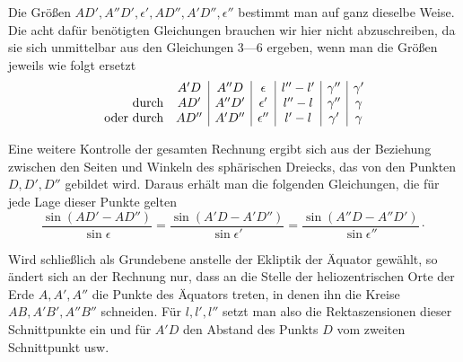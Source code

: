 Die Größen $AD',A''D',\epsilon',AD'',A'D'',\epsilon''$ bestimmt man auf ganz dieselbe Weise. Die acht dafür benötigten Gleichungen
brauchen wir hier nicht abzuschreiben, da sie sich unmittelbar aus den Gleichungen 3---6
ergeben, wenn man die Größen jeweils wie folgt ersetzt
\[
\begin{array}{r c|c|c|c|c|c}
 & A'D & A''D & \epsilon & l''-l' & \gamma'' & \gamma'\\
\text{durch} & AD' & A''D' & \epsilon' & l''-l & \gamma'' & \gamma\\
\text{oder durch} & AD'' & A'D'' & \epsilon'' & l'-l & \gamma' & \gamma
\end{array}
\]

Eine weitere Kontrolle der gesamten Rechnung ergibt sich aus der Beziehung zwischen den Seiten
und Winkeln des sphärischen Dreiecks, das von den Punkten $D,D',D''$ gebildet wird. Daraus erhält
man die folgenden Gleichungen, die für jede Lage dieser Punkte gelten
\[
\frac{\sin(AD'-AD'')}{\sin\epsilon}=\frac{\sin(A'D-A'D'')}{\sin\epsilon'}=\frac{\sin(A''D-A''D')}{\sin\epsilon''}\mathpunct{\cdot}
\]

Wird schließlich als Grundebene anstelle der Ekliptik der Äquator \hypertarget{native-185}{}gewählt, so ändert sich
an der Rechnung nur, dass an die Stelle der heliozentrischen Orte der Erde $A,A',A''$ die Punkte des
Äquators treten, in denen ihn die Kreise $AB,A'B',A''B''$ schneiden. Für $l,l',l''$ setzt man also die
Rektaszensionen dieser Schnittpunkte ein und für $A'D$ den Abstand des Punkts $D$ vom
zweiten Schnittpunkt usw.
